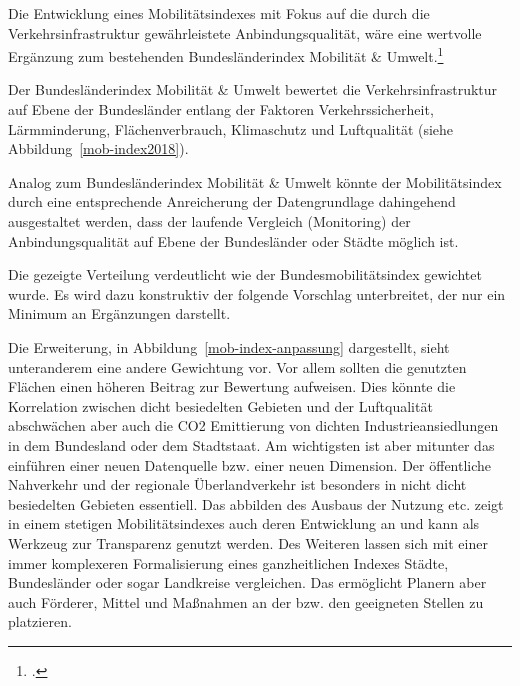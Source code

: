 Die Entwicklung eines Mobilitätsindexes mit Fokus auf die durch die Verkehrsinfrastruktur gewährleistete Anbindungsqualität, wäre eine wertvolle Ergänzung zum bestehenden Bundesländerindex Mobilität \& Umwelt.\footcite{Bundeslaenderindex:1}

Der Bundesländerindex Mobilität \& Umwelt bewertet die Verkehrsinfrastruktur auf Ebene der Bundesländer entlang der Faktoren Verkehrssicherheit, Lärmminderung, Flächenverbrauch, Klimaschutz und Luftqualität (siehe Abbildung~\ref{mob-index2018}).


Analog zum Bundesländerindex Mobilität \& Umwelt könnte der Mobilitätsindex durch eine entsprechende Anreicherung der Datengrundlage dahingehend ausgestaltet werden, dass der laufende Vergleich (Monitoring) der Anbindungsqualität auf Ebene der Bundesländer oder Städte möglich ist.


Die gezeigte Verteilung verdeutlicht wie der Bundesmobilitätsindex gewichtet wurde. Es wird dazu konstruktiv der folgende Vorschlag unterbreitet, der nur ein Minimum an Ergänzungen darstellt.


Die Erweiterung, in Abbildung~\ref{mob-index-anpassung} dargestellt, sieht unteranderem eine andere Gewichtung vor. Vor allem sollten die genutzten Flächen einen höheren Beitrag zur Bewertung aufweisen. Dies könnte die Korrelation zwischen dicht besiedelten Gebieten und der Luftqualität abschwächen aber auch die CO2 Emittierung von dichten Industrieansiedlungen in dem Bundesland oder dem Stadtstaat.
Am wichtigsten ist aber mitunter das einführen einer neuen Datenquelle bzw. einer neuen Dimension. Der öffentliche Nahverkehr und der regionale Überlandverkehr ist besonders in nicht dicht besiedelten Gebieten essentiell.
Das abbilden des Ausbaus der Nutzung etc. zeigt in einem stetigen Mobilitätsindexes auch deren Entwicklung an und kann als Werkzeug zur Transparenz genutzt werden.
Des Weiteren lassen sich mit einer immer komplexeren Formalisierung eines ganzheitlichen Indexes Städte, Bundesländer oder sogar Landkreise vergleichen. Das ermöglicht Planern aber auch Förderer, Mittel und Maßnahmen an der bzw. den geeigneten Stellen zu platzieren.
